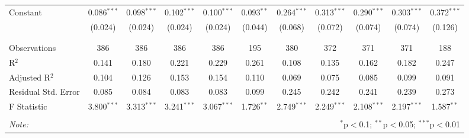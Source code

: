 \begin{table}[H]
\begin{tabular}{@{\extracolsep{4pt}}lcccccccccc}
 Constant & 0.086$^{***}$ & 0.098$^{***}$ & 0.102$^{***}$ & 0.100$^{***}$ & 0.093$^{**}$ & 0.264$^{***}$ & 0.313$^{***}$ & 0.290$^{***}$ & 0.303$^{***}$ & 0.372$^{***}$ \\ 
  & (0.024) & (0.024) & (0.024) & (0.024) & (0.044) & (0.068) & (0.072) & (0.074) & (0.074) & (0.126) \\ 
  & & & & & & & & & & \\ 
\hline \\[-1.8ex] 
Observations & 386 & 386 & 386 & 386 & 195 & 380 & 372 & 371 & 371 & 188 \\ 
R$^{2}$ & 0.141 & 0.180 & 0.221 & 0.229 & 0.261 & 0.108 & 0.135 & 0.162 & 0.182 & 0.247 \\ 
Adjusted R$^{2}$ & 0.104 & 0.126 & 0.153 & 0.154 & 0.110 & 0.069 & 0.075 & 0.085 & 0.099 & 0.091 \\ 
Residual Std. Error & 0.085 & 0.084 & 0.083 & 0.083 & 0.099 & 0.245 & 0.242 & 0.241 & 0.239 & 0.273 \\ 
F Statistic & 3.800$^{***}$ & 3.313$^{***}$ & 3.241$^{***}$ & 3.067$^{***}$ & 1.726$^{**}$ & 2.749$^{***}$ & 2.249$^{***}$ & 2.108$^{***}$ & 2.197$^{***}$ & 1.587$^{**}$ \\ 
\hline 
\hline \\[-1.8ex] 
\textit{Note:}  & \multicolumn{10}{r}{$^{*}$p$<$0.1; $^{**}$p$<$0.05; $^{***}$p$<$0.01} \\ 
\end{tabular} 
\end{table} 
